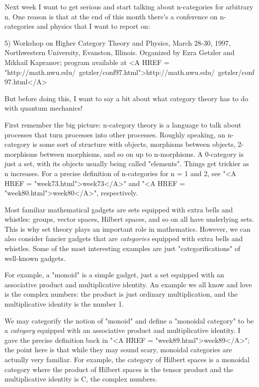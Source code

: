 Next week I want to get serious and start talking about n-categories
for arbitrary n.  One reason is that at the end of this month there's
a conference on n-categories and physics that I want to report on:

5) Workshop on Higher Category Theory and Physics, March 28-30, 1997,
Northwestern University, Evanston, Illinois.  Organized by Ezra Getzler and 
Mikhail Kapranov; program available at 
<A HREF = "http://math.nwu.edu/~getzler/conf97.html">http://math.nwu.edu/~getzler/conf97.html</A>

But before doing this, I want to say a bit about what category theory
has to do with quantum mechanics!

First remember the big picture: n-category theory is a language to
talk about processes that turn processes into other processes.
Roughly speaking, an n-category is some sort of structure with
objects, morphisms between objects, 2-morphisms between morphisms, and
so on up to n-morphisms.  A 0-category is just a set, with its objects
usually being called "elements".  Things get trickier as n increases.
For a precise definition of n-categories for n = 1 and 2, see "<A HREF = "week73.html">week73</A>"
and "<A HREF = "week80.html">week80</A>", respectively.

Most familiar mathematical gadgets are sets equipped with extra bells
and whistles: groups, vector spaces, Hilbert spaces, and so on all have
underlying sets.  This is why set theory plays an important role in
mathematics.  However, we can also consider fancier gadgets that are
\emph{categories} equipped with extra bells and whistles.  Some of the
most interesting examples are just "categorifications" of
well-known gadgets.

For example, a "monoid" is a simple gadget, just a set equipped with
an associative product and multiplicative identity.  An example we all
know and love is the complex numbers: the product is just ordinary
multiplication, and the multiplicative identity is the number 1.


We may categorify the notion of "monoid" and define a
"monoidal category" to be a \emph{category} equipped with an
associative product and multiplicative identity.  I gave the precise
definition back in "<A HREF = "week89.html">week89</A>"; the
point here is that while they may sound scary, monoidal categories are
actually very familiar.  For example, the category of Hilbert spaces is
a monoidal category where the product of Hilbert spaces is the tensor
product and the multiplicative identity is C, the complex numbers.

